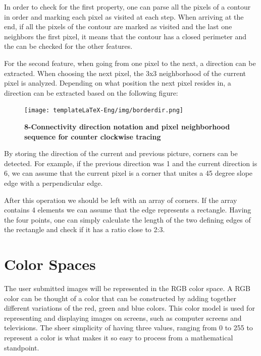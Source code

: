 \documentclass[12pt,a4paper,twoside]{report}
\begin{document}
In order to check for the first property, one can parse all the pixels of a contour in order and marking each pixel as visited at each step. When arriving at the end, if all the pixels of the contour are marked as visited and the last one neighbors the first pixel, it means that the contour has a closed perimeter and the can be checked for the other features.

For the second feature, when going from one pixel to the next, a direction can be extracted. When choosing the next pixel, the 3x3 neighborhood of the current pixel is analyzed. Depending on what position the next pixel resides in, a direction can be extracted based on the following figure:

\begin{figure}[H]
    \begin{center}
        \texttt{[image: templateLaTeX-Eng/img/borderdir.png]}
        \caption{\bf 8-Connectivity direction notation and pixel neighborhood sequence for counter clockwise tracing\footnotemark}
    \end{center}
\end{figure}

By storing the direction of the current and previous picture, corners can be detected. For example, if the previous direction was 1 and the current direction is 6, we can assume that the current pixel is a corner that unites a 45 degree slope edge with a perpendicular edge. 

After this operation we should be left with an array of corners. If the array contains 4 elements we can assume that the edge represents a rectangle. Having the four points, one can simply calculate the length of the two defining edges of the rectangle and check if it has a ratio close to 2:3.

\section{Color Spaces}
The user submitted images will be represented in the RGB color space. A RGB color can be thought of a color that can be constructed by adding together different variations of the red, green and blue colors. This color model is used for representing and displaying images on screens, such as computer screens and televisions. The sheer simplicity of having three values, ranging from 0 to 255 to represent a color is what makes it so easy to process from a mathematical standpoint.
\end{document}
